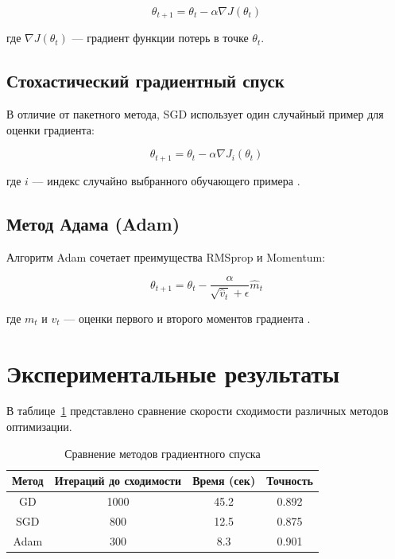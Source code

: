 \documentclass[otchet]{SCWorks}
\begin{document}
	\begin{equation}
		\label{eq:gd}
		\theta_{t+1} = \theta_t - \alpha \nabla J(\theta_t)
	\end{equation}
	
	где $\nabla J(\theta_t)$ — градиент функции потерь в точке $\theta_t$.
	
	\subsection{Стохастический градиентный спуск}
	
	В отличие от пакетного метода, SGD использует один случайный пример для оценки градиента:
	
	\begin{equation}
		\label{eq:sgd}
		\theta_{t+1} = \theta_t - \alpha \nabla J_i(\theta_t)
	\end{equation}
	
	где $i$ — индекс случайно выбранного обучающего примера \cite{bottou}.
	
	\subsection{Метод Адама (Adam)}
	
	Алгоритм Adam сочетает преимущества RMSprop и Momentum:
	
	\begin{equation}
		\label{eq:adam}
		\theta_{t+1} = \theta_t - \frac{\alpha}{\sqrt{\hat{v}_t} + \epsilon} \hat{m}_t
	\end{equation}
	
	где $m_t$ и $v_t$ — оценки первого и второго моментов градиента \cite{kingma}.
	
	\section{Экспериментальные результаты}
	
	В таблице~\ref{tab:comparison} представлено сравнение скорости сходимости различных методов оптимизации.
	
	\begin{table}[H]
		\centering
		\caption{Сравнение методов градиентного спуска}
		\label{tab:comparison}
		\begin{tabular}{|c|c|c|c|}
			\hline
			\textbf{Метод} & \textbf{Итераций до сходимости} & \textbf{Время (сек)} & \textbf{Точность} \\
			\hline
			GD & 1000 & 45.2 & 0.892 \\
			\hline
			SGD & 800 & 12.5 & 0.875 \\
			\hline
			Adam & 300 & 8.3 & 0.901 \\
			\hline
		\end{tabular}
	\end{table}
	
\end{document}
